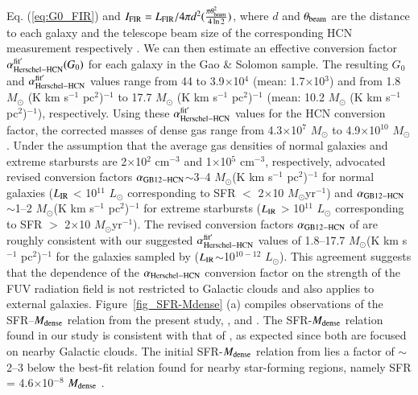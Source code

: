 \documentclass{aa}
\begin{document}
{Eq. (\ref{eq:G0_FIR}) and 
{$I_{\rm FIR}=L_{\rm FIR}/4\pi d^2(\frac{\pi \theta_{\rm beam}^2}{4\ln2})$, where $d$ and $\theta_{\rm beam}$ 
are the distance to each galaxy and the telescope beam size of the corresponding HCN measurement respectively
\citep[cf. ][]{Buchbender13}.
We can then estimate an effective conversion factor $\alpha_{\rm Herschel-HCN}^{\rm fit^\prime}(G_0)$ for each galaxy in the Gao \& Solomon sample.
The resulting $G_0$ and $\alpha_{\rm Herschel-HCN}^{\rm fit^\prime}$ values range 
from 44 to 3.9$\times$10$^{4}$ (mean: 1.7$\times$10$^{3}$) and from 1.8 $M_{\odot}$ (K km s$^{-1}$ pc$^2$)$^{-1}$ 
to 17.7 $M_{\odot}$ (K km s$^{-1}$ pc$^2$)$^{-1}$ (mean: 10.2 $M_{\odot}$ (K km s$^{-1}$ pc$^2$)$^{-1}$), respectively.
Using these $\alpha_{\rm Herschel-HCN}^{\rm fit^\prime}$ values for the HCN conversion factor, 
the corrected masses of dense gas range from 4.3$\times$10$^{7}$ $M_{\odot}$ to 4.9$\times$10$^{10}$ $M_{\odot}$. 
Under the assumption that the average gas densities of normal galaxies and extreme starbursts 
are 2$\times$10$^2$ cm$^{-3}$ and 1$\times$10$^5$ cm$^{-3}$, respectively, 
\citet{Garcia12} advocated revised conversion factors 
$\alpha_{\rm GB12-HCN}$$\sim$3--4 $M_{\odot}$(K km s$^{-1}$ pc$^2$)$^{-1}$ 
for normal galaxies ($L_{\rm IR}$ < 10$^{11}$ $L_{\odot}$ corresponding to SFR $<$ 2$\times$10 $M_{\odot}$yr$^{-1}$) 
and $\alpha_{\rm GB12-HCN}$$\sim$1--2 $M_{\odot}$(K km s$^{-1}$ pc$^2$)$^{-1}$ for extreme starbursts ($L_{\rm IR}$ > 10$^{11}$ 
$L_{\odot}$  corresponding to SFR $>$ 2$\times$10 $M_{\odot}$yr$^{-1}$).
The revised conversion factors $\alpha_{\rm GB12-HCN}$ of \citet{Garcia12} are roughly consistent with our suggested
$\alpha_{\rm Herschel-HCN}^{\rm fit^\prime}$ values of 1.8--17.7 $M_{\odot}$(K km s$^{-1}$ pc$^2$)$^{-1}$ for the galaxies sampled 
by \citet{Gao04a} ($L_{\rm IR}$$\sim$10$^{10-12}$ $L_{\odot}$). 
This agreement suggests that the dependence of the $\alpha_{\rm Herschel-HCN}$ conversion factor 
on the strength of the FUV radiation field is not restricted to Galactic clouds and also applies to external galaxies.
Figure~\ref{fig_SFR-Mdense} (a) compiles observations of the SFR--$M_{\rm dense}$ relation from the present study, \citet{Lada10}, and \citet{Gao04a}. 
The SFR-$M_{\rm dense}$ relation found in our study is consistent with that of \citet{Lada10}, as expected since both are focused on nearby Galactic clouds.
The initial SFR-$M_{\rm dense}$ relation from \citet{Gao04a} lies a factor of $\sim \,$2--3 below the best-fit relation found for nearby star-forming regions, 
namely SFR = 4.6$\times$10$^{-8}$ $M_{\rm dense}$ \citep{Lada10}.
$$}}
\end{document}
